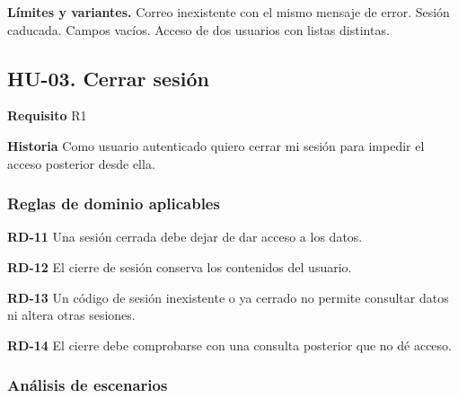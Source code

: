 {\fontsize{9}{11.8}\selectfont\textbf{Límites y variantes.} Correo inexistente con el mismo mensaje de error. Sesión caducada. Campos vacíos. Acceso de dos usuarios con listas distintas.\par}\vspace{4pt}
\clearpage\subsection*{HU-03. Cerrar sesión}

\textbf{Requisito} R1\par

\textbf{Historia} Como usuario autenticado quiero cerrar mi sesión para impedir el acceso posterior desde ella.\par

\subsubsection*{Reglas de dominio aplicables}

\textbf{RD-11} Una sesión cerrada debe dejar de dar acceso a los datos.\par

\textbf{RD-12} El cierre de sesión conserva los contenidos del usuario.\par

\textbf{RD-13} Un código de sesión inexistente o ya cerrado no permite consultar datos ni altera otras sesiones.\par

\textbf{RD-14} El cierre debe comprobarse con una consulta posterior que no dé acceso.\par

\subsubsection*{Análisis de escenarios}

